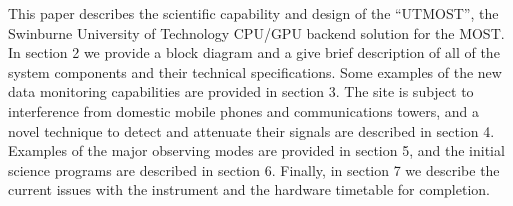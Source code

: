 This paper describes the scientific capability and design of the ``UTMOST'', the Swinburne University of Technology CPU/GPU backend solution for the MOST. In section 2 we provide a block diagram and a give brief description of all of the system components and their technical specifications. Some examples of the new data monitoring capabilities are provided in section 3. The site is subject to interference from domestic mobile phones and communications towers, and a novel technique to detect and attenuate their signals are described in section 4. Examples of the major observing modes are provided in section 5, and the initial science programs are described in section 6. Finally, in section 7 we describe the current issues with the instrument and the hardware timetable for completion.